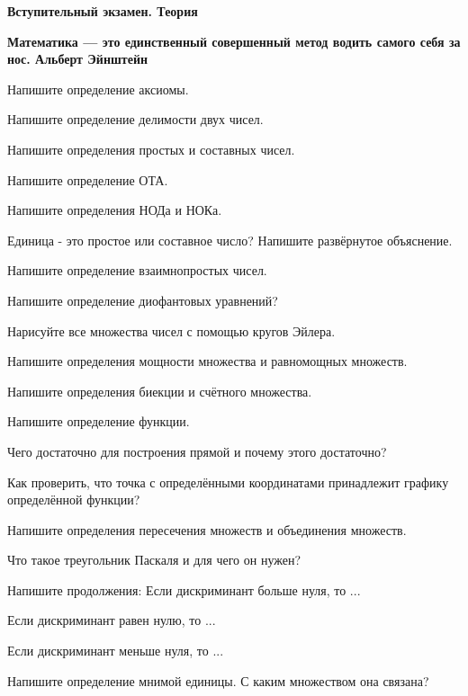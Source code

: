 \hspace{3mm}

\centerline{\bf \Huge Вступительный экзамен. Теория}


\begin{flushright}
        \scriptsize{\textbf{Математика — это единственный совершенный метод водить самого себя за нос. Альберт Эйнштейн}}
\end{flushright}

 Напишите определение аксиомы.

 Напишите определение делимости двух чисел. 

 Напишите определения простых и составных чисел.

 Напишите определение ОТА.

 Напишите определения НОДа и НОКа.

 Единица - это простое или составное число? Напишите развёрнутое объяснение.

 Напишите определение взаимнопростых чисел.

 Напишите определение диофантовых уравнений?

 Нарисуйте все множества чисел с помощью кругов Эйлера.

 Напишите определения мощности множества и равномощных множеств.

 Напишите определения биекции и счётного множества.

 Напишите определение функции.

 Чего достаточно для построения прямой и почему этого достаточно?

 Как проверить, что точка с определёнными координатами принадлежит графику определённой функции?

 Напишите определения пересечения множеств и объединения множеств.

 Что такое треугольник Паскаля и для чего он нужен?

 Напишите продолжения: Если дискриминант больше нуля, то ...

Если дискриминант равен нулю, то ...

Если дискриминант меньше нуля, то ...

 Напишите определение мнимой единицы. С каким множеством она связана?

